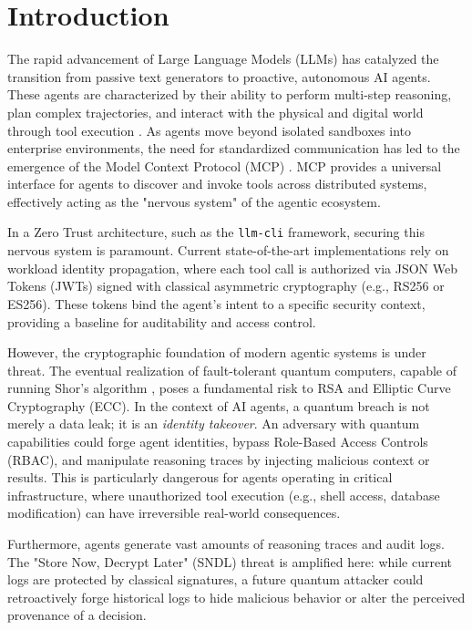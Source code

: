 \documentclass[conference]{IEEEtran}
\begin{document}
\section{Introduction}
The rapid advancement of Large Language Models (LLMs) has catalyzed the transition from passive text generators to proactive, autonomous AI agents. These agents are characterized by their ability to perform multi-step reasoning, plan complex trajectories, and interact with the physical and digital world through tool execution \cite{react2022}. As agents move beyond isolated sandboxes into enterprise environments, the need for standardized communication has led to the emergence of the Model Context Protocol (MCP) \cite{mcp2024}. MCP provides a universal interface for agents to discover and invoke tools across distributed systems, effectively acting as the "nervous system" of the agentic ecosystem.

In a Zero Trust architecture, such as the \texttt{llm-cli} framework, securing this nervous system is paramount. Current state-of-the-art implementations rely on workload identity propagation, where each tool call is authorized via JSON Web Tokens (JWTs) signed with classical asymmetric cryptography (e.g., RS256 or ES256). These tokens bind the agent's intent to a specific security context, providing a baseline for auditability and access control.

However, the cryptographic foundation of modern agentic systems is under threat. The eventual realization of fault-tolerant quantum computers, capable of running Shor's algorithm \cite{shor1994}, poses a fundamental risk to RSA and Elliptic Curve Cryptography (ECC). In the context of AI agents, a quantum breach is not merely a data leak; it is an \textit{identity takeover}. An adversary with quantum capabilities could forge agent identities, bypass Role-Based Access Controls (RBAC), and manipulate reasoning traces by injecting malicious context or results. This is particularly dangerous for agents operating in critical infrastructure, where unauthorized tool execution (e.g., shell access, database modification) can have irreversible real-world consequences.

Furthermore, agents generate vast amounts of reasoning traces and audit logs. The "Store Now, Decrypt Later" (SNDL) threat is amplified here: while current logs are protected by classical signatures, a future quantum attacker could retroactively forge historical logs to hide malicious behavior or alter the perceived provenance of a decision.
\end{document}
